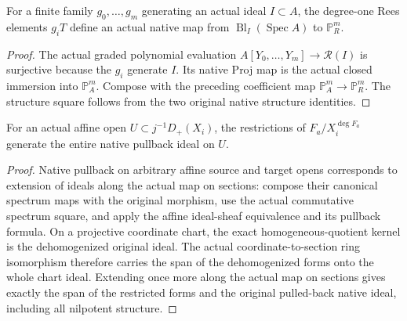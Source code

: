 \begin{definition}
\label{def:blowup-projective-affine-map}
\leanok
{}
For a finite family $g_0,\ldots,g_m$ generating an actual ideal $I\subset A$,
the degree-one Rees elements $g_iT$ define an actual native map from
$\operatorname{Bl}_I(\operatorname{Spec}A)$ to $\mathbb P^m_R$.
\end{definition}
\begin{proof}
The actual graded polynomial evaluation $A[Y_0,\ldots,Y_m]\to\mathcal R(I)$
is surjective because the $g_i$ generate $I$. Its native Proj map is the
actual closed immersion into $\mathbb P^m_A$. Compose with the preceding
coefficient map $\mathbb P^m_A\to\mathbb P^m_R$. The structure square
follows from the two original native structure identities.
\end{proof}

\endgroup

\begingroup

\begin{lemma}
\label{lem:blowup-projective-pulled-forms}
\leanok
{}
For an actual affine open $U\subset j^{-1}D_+(X_i)$, the restrictions of
$F_a/X_i^{\deg F_a}$ generate the entire native pullback ideal on $U$.
\end{lemma}
\begin{proof}
Native pullback on arbitrary affine source and target opens corresponds to
extension of ideals along the actual map on sections: compose their canonical
spectrum maps with the original morphism, use the actual commutative spectrum
square, and apply the affine ideal-sheaf equivalence and its pullback formula.
On a projective coordinate chart, the exact homogeneous-quotient kernel is the
dehomogenized original ideal. The actual coordinate-to-section ring isomorphism
therefore carries the span of the dehomogenized forms onto the whole chart ideal.
Extending once more along the actual map on sections gives exactly the span of
the restricted forms and the original pulled-back native ideal, including all
nilpotent structure.
\end{proof}

